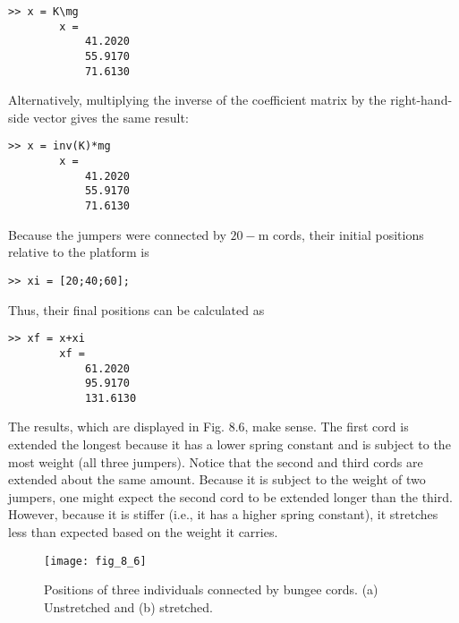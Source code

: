 \documentclass[../main.tex]{subfiles}
\begin{document}
\begin{example}
    \begin{lstlisting}[numbers=none,frame=none]
        >> x = K\mg
        x =
            41.2020
            55.9170
            71.6130
	\end{lstlisting}

    \noindent Alternatively, multiplying the inverse of the coefficient matrix by the right-hand-side vector gives the same result:

    \begin{lstlisting}[numbers=none,frame=none]
        >> x = inv(K)*mg
        x =
            41.2020
            55.9170
            71.6130
	\end{lstlisting}

    \noindent Because the jumpers were connected by $20-\mathrm{m}$ cords, their initial positions relative to the platform is

    \begin{lstlisting}[numbers=none,frame=none]
        >> xi = [20;40;60];
	\end{lstlisting}

    \noindent Thus, their final positions can be calculated as

    \begin{lstlisting}[numbers=none,frame=none]
        >> xf = x+xi
        xf =
            61.2020
            95.9170
            131.6130
	\end{lstlisting}

    The results, which are displayed in Fig. 8.6, make sense.
    The first cord is extended the longest because it has a lower
    spring constant and is subject to the most weight (all three
    jumpers). Notice that the second and third cords are extended
    about the same amount. Because it is subject to the weight of two
    jumpers, one might expect the second cord to be extended longer
    than the third. However, because it is stiffer (i.e., it has a higher
    spring constant), it stretches less than expected based on the
    weight it carries.

    \begin{figure}[H]
        \centering
        \texttt{[image: fig\_8\_6]}
        \caption{\textsf{Positions of three
        individuals connected
        by bungee cords.
        (a) Unstretched and
        (b) stretched.}}
        \label{fig:fig_8_6}
    \end{figure}

\end{example}
\end{document}
